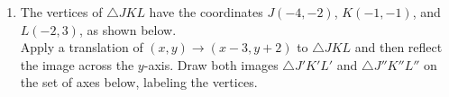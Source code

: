 \documentclass[12pt, twoside]{article}
\begin{document}
\begin{enumerate}
\item The vertices of $\triangle JKL$ have the coordinates $J(-4,-2)$, $K(-1,-1)$, and $L(-2,3)$, as shown below. \\[0.5cm]
  Apply a translation of $(x,y) \rightarrow (x-3, y+2)$ to $\triangle JKL$ and then reflect the image across the $y$-axis. Draw both images $\triangle J'K'L'$ and $\triangle J''K''L''$ on the set of axes below, labeling the vertices.  \vspace{3cm}
  \begin{center}
  \end{center}

\end{enumerate}
\end{document}
